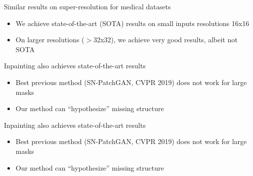\begin{frame}{Similar results on super-resolution for medical datasets}

\begin{itemize}
 \item We achieve state-of-the-art (SOTA) results on small inputs resolutions 16x16
 \item On larger resolutions ($>$32x32), we achieve very good results, albeit not SOTA
\end{itemize}

\begin{center}
\vt
{}
\end{center}
 
\end{frame}

\begin{frame}{Inpainting also achieves state-of-the-art results}

\begin{itemize}
 \item Best previous method (SN-PatchGAN, CVPR 2019) does not work for large masks
 \item Our method can ``hypothesize'' missing structure
\end{itemize}

\begin{center}
{}
\end{center}
 
\end{frame}

\begin{frame}{Inpainting also achieves state-of-the-art results}

\begin{itemize}
 \item Best previous method (SN-PatchGAN, CVPR 2019) does not work for large masks
 \item Our method can ``hypothesize'' missing structure
\end{itemize}

\begin{center}
\vt
{}
\end{center}
 
\end{frame}


